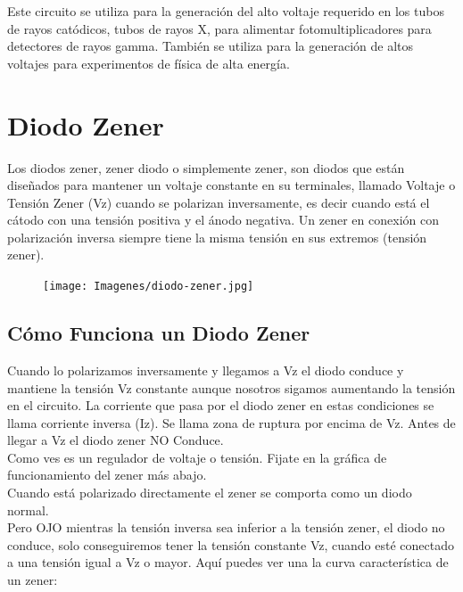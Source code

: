 \documentclass{article}
\begin{document}
Este circuito se utiliza para la generación del alto voltaje requerido en los tubos de rayos catódicos, tubos de rayos X, para alimentar fotomultiplicadores para detectores de rayos gamma. También se utiliza para la generación de altos voltajes para experimentos de física de alta energía.\citep{multTensWiki}\\


\section{Diodo Zener}

 Los diodos zener, zener diodo o simplemente zener, son diodos que están diseñados para mantener un voltaje constante en su terminales, llamado Voltaje o Tensión Zener (Vz) cuando se polarizan inversamente, es decir cuando está el cátodo con una tensión positiva y el ánodo negativa. Un zener en conexión con polarización inversa siempre tiene la misma tensión en sus extremos (tensión zener).\citep{dZener}\\

\begin{figure}[ht!]
   \centering
\texttt{[image: Imagenes/diodo-zener.jpg]}
\caption{}
     \label{fig:zener}
 \end{figure}
 
 \subsection{Cómo Funciona un Diodo Zener}

 Cuando lo polarizamos inversamente y llegamos a Vz el diodo conduce y mantiene la tensión Vz constante aunque nosotros sigamos aumentando la tensión en el circuito. La corriente que pasa por el diodo zener en estas condiciones se llama corriente inversa (Iz).
 Se llama zona de ruptura por encima de Vz. Antes de llegar a Vz el diodo zener NO Conduce.\citep{dZener}\\

 Como ves es un regulador de voltaje o tensión. Fijate en la gráfica de funcionamiento del zener más abajo.\citep{dZener}\\

 Cuando está polarizado directamente el zener se comporta como un diodo normal.\citep{dZener}\\

 Pero OJO mientras la tensión inversa sea inferior a la tensión zener, el diodo no conduce, solo conseguiremos tener la tensión constante Vz, cuando esté conectado a una tensión igual a Vz o mayor. Aquí puedes ver una la curva característica de un zener:\citep{dZener}\\
 
\end{document}
